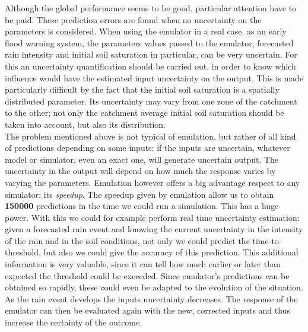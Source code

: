 Although the global performance seems to be good, particular attention have to be paid.
These prediction errors are found when no uncertainty on the parameters is considered.
When using the emulator in a real case, as an early flood warning system, the parameters values passed to the emulator, forecasted rain intensity and initial soil saturation in particular, can be very uncertain.
For this an uncertainty quantification should be carried out, in order to know which influence would have the estimated input uncertainty on the output.
This is made particularly difficult by the fact that the initial soil saturation is a spatially distributed parameter.
Its uncertainty may vary from one zone of the catchment to the other; not only 
the catchment average initial soil saturation should be taken into account, but also its distribution.\\

The problem mentioned above is not typical of emulation, but rather of all kind of predictions depending on some inputs: if the inputs are uncertain, whatever model or simulator, even an exact one, will generate uncertain output.
The uncertainty in the output will depend on how much the response varies by varying the parameters.
Emulation however offers a big advantage respect to any simulator: its \emph{speedup}.
The speedup given by emulation allow us to obtain \textbf{\num{150000}} predictions in the time we could run a simulation.
This has a huge power.
With this we could for example perform real time uncertainty estimation: given a forecasted rain event and knowing the current uncertainty in the intensity of the rain and in the soil conditions, not only we could predict the time-to-threshold, but also we could give the accuracy of this prediction.
This additional information is very valuable, since it can tell how much earlier or later than expected the threshold could be exceeded.
Since emulator's predictions can be obtained so rapidly, these could even be adapted to the evolution of the situation.
As the rain event develops the inputs uncertainty decreases.
The response of the emulator can then be evaluated again with the new, corrected inputs and thus increase the certainty of the outcome.












